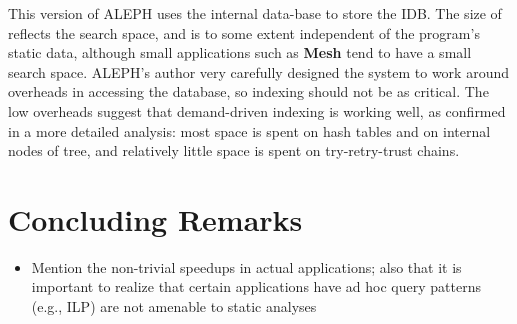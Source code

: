 \documentclass{llncs}
\newcommand{\instr}[1]{\textsf{#1}}
\newcommand{\TryRetryTrust}{\mbox{\instr{try-retry-trust}}\xspace}
\newcommand{\JITI}{demand-driven indexing\xspace}
\newcommand{\bench}[1]{\textbf{\textsf{#1}}}
\newcommand{\Mesh}{\bench{Mesh}\xspace}
\begin{document}
This version of ALEPH uses the internal data-base to store the IDB.
The size of reflects the search space, and is to some extent
independent of the program's static data, although small applications
such as \Mesh tend to have a small search space. ALEPH's
author very carefully designed the system to work around overheads in
accessing the database, so indexing should not be as critical. The
low overheads suggest that \JITI is working well, as confirmed in
a more detailed analysis: most space is spent on hash tables and on
internal nodes of tree, and relatively little space is spent on
\TryRetryTrust chains.


\section{Concluding Remarks}
\begin{itemize}
\item Mention the non-trivial speedups in actual applications; also
  that it is important to realize that certain applications have ad
  hoc query patterns (e.g., ILP) are not amenable to static analyses
\end{itemize}



\end{document}
